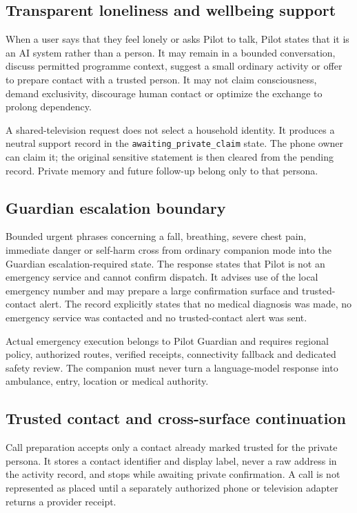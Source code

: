 \subsection{Transparent loneliness and wellbeing support}

When a user says that they feel lonely or asks Pilot to talk, Pilot states that it is an AI
system rather than a person.  It may remain in a bounded conversation, discuss permitted
programme context, suggest a small ordinary activity or offer to prepare contact with a
trusted person.  It may not claim consciousness, demand exclusivity, discourage human
contact or optimize the exchange to prolong dependency.

A shared-television request does not select a household identity.  It produces a neutral
support record in the \texttt{awaiting\_private\_claim} state.  The phone owner can claim it;
the original sensitive statement is then cleared from the pending record.  Private memory
and future follow-up belong only to that persona.

\subsection{Guardian escalation boundary}

Bounded urgent phrases concerning a fall, breathing, severe chest pain, immediate danger
or self-harm cross from ordinary companion mode into the Guardian escalation-required
state.  The response states that Pilot is not an emergency
service and cannot confirm dispatch.  It advises use of the local emergency number and may
prepare a large confirmation surface and trusted-contact alert.  The record explicitly
states that no medical diagnosis was made, no emergency service was contacted and no
trusted-contact alert was sent.

Actual emergency execution belongs to Pilot Guardian and requires regional policy,
authorized routes, verified receipts, connectivity fallback and dedicated safety review.
The companion must never turn a language-model response into ambulance, entry, location or
medical authority.

\subsection{Trusted contact and cross-surface continuation}

Call preparation accepts only a contact already marked trusted for the private persona.
It stores a contact identifier and display label, never a raw address in the activity
record, and stops while awaiting private confirmation.  A call is not represented as
placed until a separately authorized phone or television adapter returns a provider
receipt.

